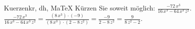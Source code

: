 \begin{MAufgabe}{Kuerzen}{kr, dh, MaTeX}
K\"urzen Sie soweit m\"oglich: $\frac{- 72\, x^3}{16\, x^3 - 64\, x^3\, z^2}$.\\ 
\ifLsg\MLoesung
\quad $\frac{- 72\, x^3}{16\, x^3 - 64\, x^3\, z^2}=\frac{(8\, x^3)\cdot(-9)}{(8\, x^3)\cdot(2 - 8\, z^2)}=\frac{-9}{2 - 8\, z^2}=\frac{9}{8\, z^2 - 2}$.\else\relax\fi
 \end{MAufgabe}